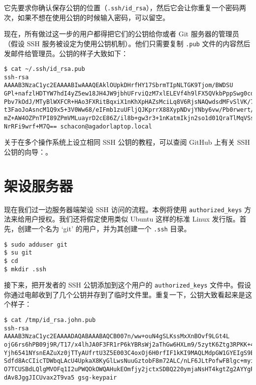 \documentclass[a4paper]{book}
\begin{document}
它先要求你确认保存公钥的位置（\texttt{.ssh/id\_rsa}），然后它会让你重复一个密码两次，如果不想在使用公钥的时候输入密码，可以留空。

现在，所有做过这一步的用户都得把它们的公钥给你或者 Git 服务器的管理员（假设 SSH 服务被设定为使用公钥机制）。他们只需要复制 \texttt{.pub} 文件的内容然后发邮件给管理员。公钥的样子大致如下：

\begin{shaded}\begin{verbatim}
$ cat ~/.ssh/id_rsa.pub 
ssh-rsa AAAAB3NzaC1yc2EAAAABIwAAAQEAklOUpkDHrfHY17SbrmTIpNLTGK9Tjom/BWDSU
GPl+nafzlHDTYW7hdI4yZ5ew18JH4JW9jbhUFrviQzM7xlELEVf4h9lFX5QVkbPppSwg0cda3
Pbv7kOdJ/MTyBlWXFCR+HAo3FXRitBqxiX1nKhXpHAZsMciLq8V6RjsNAQwdsdMFvSlVK/7XA
t3FaoJoAsncM1Q9x5+3V0Ww68/eIFmb1zuUFljQJKprrX88XypNDvjYNby6vw/Pb0rwert/En
mZ+AW4OZPnTPI89ZPmVMLuayrD2cE86Z/il8b+gw3r3+1nKatmIkjn2so1d01QraTlMqVSsbx
NrRFi9wrf+M7Q== schacon@agadorlaptop.local
\end{verbatim}\end{shaded}

关于在多个操作系统上设立相同 SSH 公钥的教程，可以查阅 GitHub 上有关 SSH 公钥的向导：。

\section{架设服务器}

现在我们过一边服务器端架设 SSH 访问的流程。本例将使用 \texttt{authorized\_keys} 方法来给用户授权。我们还将假定使用类似 Ubuntu 这样的标准 Linux 发行版。首先，创建一个名为 `git' 的用户，并为其创建一个 \texttt{.ssh} 目录。

\begin{shaded}\begin{verbatim}
$ sudo adduser git
$ su git
$ cd
$ mkdir .ssh
\end{verbatim}\end{shaded}

接下来，把开发者的 SSH 公钥添加到这个用户的 \texttt{authorized\_keys} 文件中。假设你通过电邮收到了几个公钥并存到了临时文件里。重复一下，公钥大致看起来是这个样子：

\begin{shaded}\begin{verbatim}
$ cat /tmp/id_rsa.john.pub
ssh-rsa AAAAB3NzaC1yc2EAAAADAQABAAABAQCB007n/ww+ouN4gSLKssMxXnBOvf9LGt4L
ojG6rs6hPB09j9R/T17/x4lhJA0F3FR1rP6kYBRsWj2aThGw6HXLm9/5zytK6Ztg3RPKK+4k
Yjh6541NYsnEAZuXz0jTTyAUfrtU3Z5E003C4oxOj6H0rfIF1kKI9MAQLMdpGW1GYEIgS9Ez
Sdfd8AcCIicTDWbqLAcU4UpkaX8KyGlLwsNuuGztobF8m72ALC/nLF6JLtPofwFBlgc+myiv
O7TCUSBdLQlgMVOFq1I2uPWQOkOWQAHukEOmfjy2jctxSDBQ220ymjaNsHT4kgtZg2AYYgPq
dAv8JggJICUvax2T9va5 gsg-keypair
\end{verbatim}\end{shaded}
\end{document}
